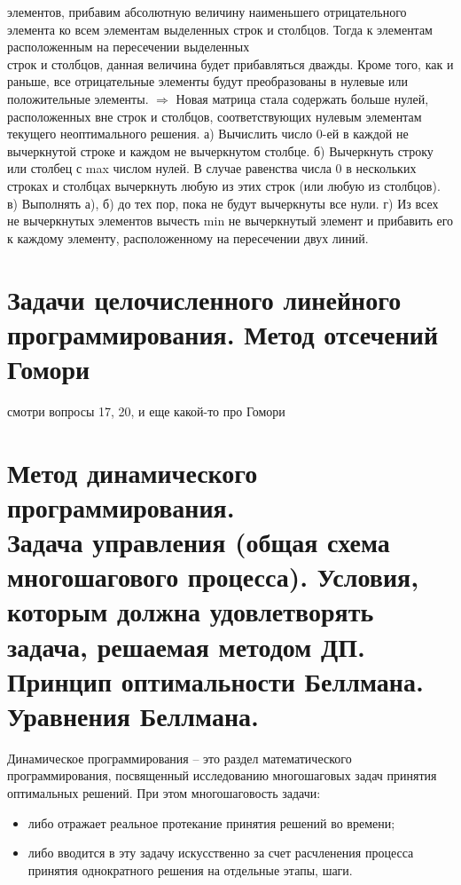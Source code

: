 \documentclass[17pt]{extarticle}
\begin{document}
\begin{enumerate}
          элементов, прибавим абсолютную величину наименьшего
          отрицательного элемента ко всем элементам выделенных строк и
          столбцов.
          \subitem Тогда к элементам расположенным на пересечении выделенных \\
          строк и столбцов, данная величина будет прибавляться дважды.
          Кроме того, как и раньше, все отрицательные элементы будут
          преобразованы в нулевые или положительные элементы.
          \subitem $\Rightarrow$ Новая матрица стала содержать больше нулей, расположенных
          вне строк и столбцов, соответствующих нулевым элементам
          текущего неоптимального решения.
          \subitem а) Вычислить число 0-ей в каждой не вычеркнутой строке и каждом не вычеркнутом столбце.
          \subitem б) Вычеркнуть строку или столбец с max числом нулей. В
          случае равенства числа 0 в нескольких строках и столбцах
          вычеркнуть любую из этих строк (или любую из столбцов).
          \subitem в) Выполнять а), б) до тех пор, пока не будут вычеркнуты все нули.
          \subitem г) Из всех не вычеркнутых элементов вычесть min не
          вычеркнутый элемент и прибавить его к каждому элементу,
          расположенному на пересечении двух линий.
\end{enumerate}



\section{Задачи целочисленного линейного программирования. Метод отсечений Гомори}
смотри вопросы 17, 20, и еще какой-то про Гомори


\section{Метод динамического программирования. \\ Задача управления (общая схема
  многошагового процесса). Условия, которым должна удовлетворять задача, решаемая
  методом ДП. \\ Принцип оптимальности Беллмана. \\ Уравнения Беллмана.}
\begin{definition}
    Динамическое программирования -- это раздел математического программирования,
    посвященный исследованию многошаговых задач
    принятия оптимальных решений.
    При этом многошаговость задачи:
    \begin{itemize}
        \item либо отражает реальное протекание принятия решений во времени;
        \item либо вводится в эту задачу искусственно за счет расчленения процесса принятия однократного решения на отдельные этапы, шаги.
    \end{itemize}
\end{definition}
\end{document}
